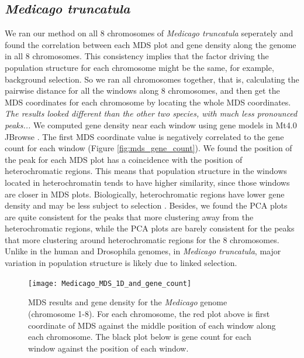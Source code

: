 \documentclass[11pt, oneside]{article}   	%
\newcommand{\plr}[1]{{\em \color{blue} #1}}
\begin{document}
\subsection{\textit{Medicago truncatula}}
We ran our method on all 8 chromosomes of \textit{Medicago truncatula} seperately 
and found the correlation between each MDS plot and gene density along the genome in all 8 chromosomes. 
This consistency implies that the factor driving the population structure for each chromosome might be the same, for example, background selection.
So we ran all chromosomes together, that is, calculating the pairwise distance for all the windows along 8 chromosomes,
and then get the MDS coordinates for each chromosome by locating the whole MDS coordinates.
\plr{The results looked different than the other two species, with much less pronounced peaks...}  
We computed gene density near each window using gene models in Mt4.0 JBrowse \citep{tang2014improved}. 
The first MDS coordinate value is negatively correlated to the gene count for each window (Figure \ref{fig:mds_gene_count}).
We found the position of the peak for each MDS plot has a coincidence with the position of heterochromatic regions. 
This means that population structure in the windows located in heterochromatin tends to have higher similarity, since those windows are closer in MDS plots.
Biologically, heterochromatic regions have lower gene density and may be less subject to selection \citep{kulikova2001integration,paape2013selection}. 
Besides, we found the PCA plots are quite consistent for the peaks that more clustering away from the heterochromatic regions, 
while the PCA plots are barely consistent for the peaks that more clustering around heterochromatic regions for the 8 chromosomes.
Unlike in the human and Drosophila genomes, in \textit{Medicago truncatula}, major variation in population structure is likely due to linked selection. 

\begin{figure}
    \begin{center}
       \texttt{[image: Medicago\_MDS\_1D\_and\_gene\_count]}
    \end{center}
    \caption{
         MDS results and gene density for the \textit{Medicago} genome (chromosome 1-8). 
         For each chromosome, the red plot above is first coordinate of MDS against the middle position of each window along each chromosome. 
         The black plot below is gene count for each window against the position of each window.
         \label{fig:mds_medicago}
    }
\end{figure}
\end{document}
